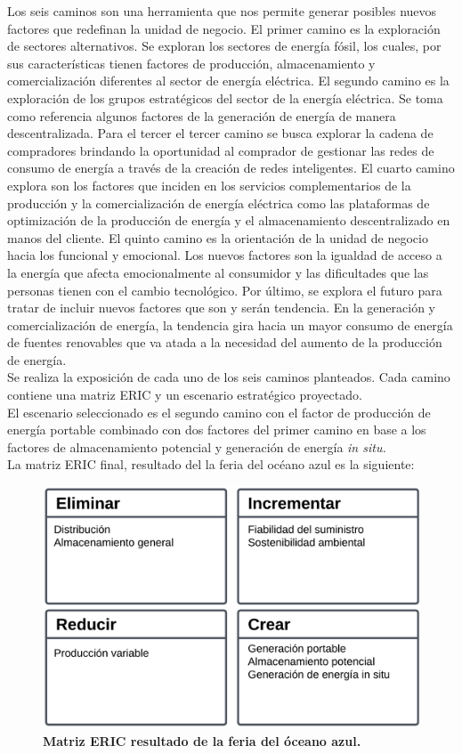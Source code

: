 \documentclass{article}
\begin{document}
Los seis caminos son una herramienta que nos permite generar posibles nuevos factores que redefinan la unidad de negocio. El primer camino es la exploración de sectores alternativos. Se exploran los sectores de energía fósil, los cuales, por sus características tienen factores de producción, almacenamiento y comercialización diferentes al sector de energía eléctrica. El segundo camino es la exploración de los grupos estratégicos del sector de la energía eléctrica. Se toma como referencia algunos factores de la generación de energía de manera descentralizada. Para el tercer el tercer camino se busca explorar la cadena de compradores brindando la oportunidad al comprador de gestionar las redes de consumo de energía a través de la creación de redes inteligentes. El cuarto camino explora son los factores que inciden en los servicios complementarios de la producción y la comercialización de energía eléctrica como las plataformas de optimización de la producción de energía y el almacenamiento descentralizado en manos del cliente. El quinto camino es la orientación de la unidad de negocio hacia los funcional y emocional. Los nuevos factores son la igualdad de acceso a la energía que afecta emocionalmente al consumidor  y las dificultades que las personas tienen con el cambio tecnológico. Por último, se explora el futuro para tratar de incluir nuevos factores que son y serán tendencia. En la generación y comercialización de energía, la tendencia gira hacia un mayor consumo de energía de fuentes renovables que va atada a la necesidad del aumento de la producción de energía. 
\\

Se realiza la exposición de cada uno de los seis caminos planteados. Cada camino contiene una matriz ERIC y un escenario estratégico proyectado. 
\\

El escenario seleccionado es el segundo camino con el factor de producción de energía portable combinado con dos factores del primer camino en base a los factores de almacenamiento potencial y generación de energía \textit{in situ.} 
\\

La matriz ERIC final, resultado del la feria del océano azul es la siguiente: 
\begin{figure}[h!]
    \centering
    \includegraphics[width=0.8\linewidth]{Matriz eric.png}
    \caption{\textbf{Matriz ERIC resultado de la feria del óceano azul.}}
    \label{fig:enter-label}
\end{figure}
\end{document}
